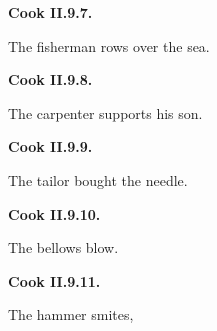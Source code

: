 \par\begin{minipage}{\linewidth}\raggedright
\textbf{Cook II.9.7.}

The fisherman rows over the sea.

\end{minipage}\par\addvspace{4pt}

\par\begin{minipage}{\linewidth}\raggedright
\textbf{Cook II.9.8.}

The carpenter supports his son.

\end{minipage}\par\addvspace{4pt}

\par\begin{minipage}{\linewidth}\raggedright
\textbf{Cook II.9.9.}

The tailor bought the needle.

\end{minipage}\par\addvspace{4pt}

\par\begin{minipage}{\linewidth}\raggedright
\textbf{Cook II.9.10.}

The bellows blow.

\end{minipage}\par\addvspace{4pt}

\par\begin{minipage}{\linewidth}\raggedright
\textbf{Cook II.9.11.}

The hammer smites,

\end{minipage}\par\addvspace{4pt}

